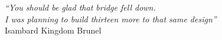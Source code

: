 
\cleardoublepage
\thispagestyle{plain}

\vspace*{8cm}

\begin{flushright}
   \textsl{``You should be glad that bridge fell down. \\
           I was planning to build thirteen more to that same design''} \\
\vspace*{1.5cm}
           Isambard Kingdom Brunel
\end{flushright}
